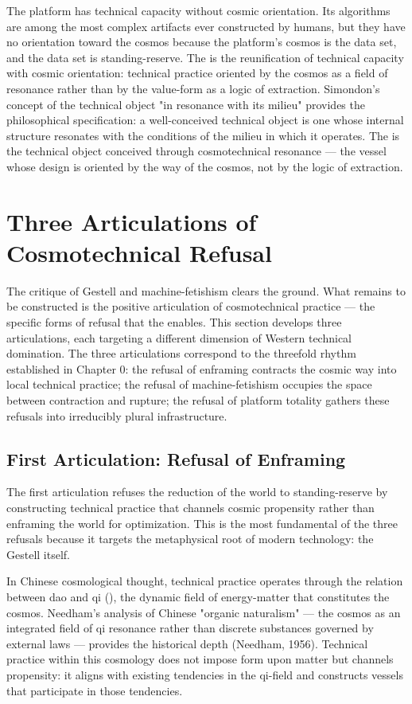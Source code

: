 The platform has technical capacity without cosmic orientation. Its algorithms are among the most complex artifacts ever constructed by humans, but they have no orientation toward the cosmos because the platform's cosmos is the data set, and the data set is standing-reserve. The   is the reunification of technical capacity with cosmic orientation: technical practice oriented by the cosmos as a field of resonance rather than by the value-form as a logic of extraction. Simondon's concept of the technical object "in resonance with its milieu" provides the philosophical specification: a well-conceived technical object is one whose internal structure resonates with the conditions of the milieu in which it operates. The   is the technical object conceived through cosmotechnical resonance — the vessel whose design is oriented by the way of the cosmos, not by the logic of extraction.

\section{Three Articulations of Cosmotechnical Refusal}

The critique of Gestell and machine-fetishism clears the ground. What remains to be constructed is the positive articulation of cosmotechnical practice — the specific forms of refusal that the   enables. This section develops three articulations, each targeting a different dimension of Western technical domination. The three articulations correspond to the threefold rhythm established in Chapter 0: the refusal of enframing contracts the cosmic way into local technical practice; the refusal of machine-fetishism occupies the space between contraction and rupture; the refusal of platform totality gathers these refusals into irreducibly plural infrastructure.

\subsection{First Articulation: Refusal of Enframing}

The first articulation refuses the reduction of the world to standing-reserve by constructing technical practice that channels cosmic propensity rather than enframing the world for optimization. This is the most fundamental of the three refusals because it targets the metaphysical root of modern technology: the Gestell itself.

In Chinese cosmological thought, technical practice operates through the relation between dao and qi (), the dynamic field of energy-matter that constitutes the cosmos. Needham's analysis of Chinese "organic naturalism" — the cosmos as an integrated field of qi resonance rather than discrete substances governed by external laws — provides the historical depth (Needham, 1956). Technical practice within this cosmology does not impose form upon matter but channels propensity: it aligns with existing tendencies in the qi-field and constructs vessels that participate in those tendencies.

